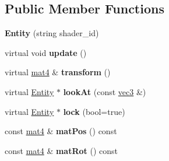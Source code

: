 \subsection*{Public Member Functions}
\begin{DoxyCompactItemize}
\item 
\hypertarget{classj3d_1_1base_1_1Entity_a1e26facf0f0b70e24c5255783bb70c8e}{}{\bfseries Entity} (string shader\+\_\+id)\label{classj3d_1_1base_1_1Entity_a1e26facf0f0b70e24c5255783bb70c8e}

\item 
\hypertarget{classj3d_1_1base_1_1Entity_af488650fced36d7d51450d5977e4d568}{}virtual void {\bfseries update} ()\label{classj3d_1_1base_1_1Entity_af488650fced36d7d51450d5977e4d568}

\item 
\hypertarget{classj3d_1_1base_1_1Entity_aa25b76f4e301dec12d4dabdac4c61d29}{}virtual \hyperlink{structj3d_1_1mat4}{mat4} \& {\bfseries transform} ()\label{classj3d_1_1base_1_1Entity_aa25b76f4e301dec12d4dabdac4c61d29}

\item 
\hypertarget{classj3d_1_1base_1_1Entity_aae96ef3ce4a8877cff2e6176cc2cbaa4}{}virtual \hyperlink{classj3d_1_1base_1_1Entity}{Entity} $\ast$ {\bfseries look\+At} (const \hyperlink{structj3d_1_1vec3}{vec3} \&)\label{classj3d_1_1base_1_1Entity_aae96ef3ce4a8877cff2e6176cc2cbaa4}

\item 
\hypertarget{classj3d_1_1base_1_1Entity_a5ae012725f6f8d33a7790a747dff25fb}{}virtual \hyperlink{classj3d_1_1base_1_1Entity}{Entity} $\ast$ {\bfseries lock} (bool=true)\label{classj3d_1_1base_1_1Entity_a5ae012725f6f8d33a7790a747dff25fb}

\item 
\hypertarget{classj3d_1_1base_1_1Entity_afa359ace8833078c6d195282f6a6a5a1}{}const \hyperlink{structj3d_1_1mat4}{mat4} \& {\bfseries mat\+Pos} () const \label{classj3d_1_1base_1_1Entity_afa359ace8833078c6d195282f6a6a5a1}

\item 
\hypertarget{classj3d_1_1base_1_1Entity_a3244e4cde4d041318b55d339645f2a04}{}const \hyperlink{structj3d_1_1mat4}{mat4} \& {\bfseries mat\+Rot} () const \label{classj3d_1_1base_1_1Entity_a3244e4cde4d041318b55d339645f2a04}

\end{DoxyCompactItemize}
